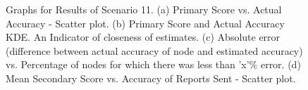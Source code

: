 \documentclass[journal]{IEEEtran}
\begin{document}
\begin{figure}[!ht]
\caption{Graphs for Results of Scenario 11. (a) Primary Score vs. Actual Accuracy - Scatter plot. (b) Primary Score and Actual Accuracy KDE. An Indicator of closeness of estimates. (c) Absolute error (difference between actual accuracy of node and estimated accuracy) vs. Percentage of nodes for which there was less than 'x'\% error. (d) Mean Secondary Score vs. Accuracy of Reports Sent - Scatter plot.}
\label{fig:apdx:sc11}
\centering
{}
\hfill
{}
\end{figure}
\end{document}
